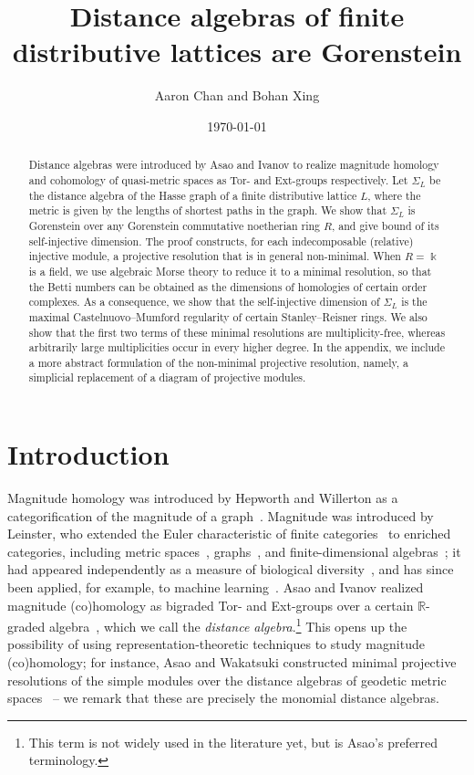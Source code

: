 \documentclass[a4paper,leqno]{amsart}
\title[Gorenstein distance algebras of lattices]{Distance algebras of finite distributive lattices are Gorenstein}
\author{Aaron Chan and Bohan Xing}
\date{\today}
\begin{document}
\begin{abstract}
Distance algebras were introduced by Asao and Ivanov to realize magnitude homology and cohomology of quasi-metric spaces as Tor- and Ext-groups respectively. 
Let $\Sigma_L$ be the distance algebra of the Hasse graph of a finite distributive lattice $L$, where the metric is given by the lengths of shortest paths in the graph.  
We show that $\Sigma_L$ is Gorenstein over any Gorenstein commutative noetherian ring $R$, and give bound of its self-injective dimension. 
The proof constructs, for each indecomposable (relative) injective module, a projective resolution that is in general non-minimal.  When $R=\Bbbk$ is a field, we use algebraic Morse theory to reduce it to a minimal resolution, so that the Betti numbers can be obtained as the dimensions of homologies of certain order complexes.
As a consequence, we show that the self-injective dimension of $\Sigma_L$ is the maximal Castelnuovo--Mumford regularity of certain Stanley--Reisner rings.  We also show that the first two terms of these minimal resolutions are multiplicity-free, whereas arbitrarily large multiplicities occur in every higher degree.  In the appendix, we include a more abstract formulation of the non-minimal projective resolution, namely, a simplicial replacement of a diagram of projective modules.
\end{abstract}
\maketitle
\tableofcontents

\section{Introduction}
\label{sec:introduction}


Magnitude homology was introduced by Hepworth and Willerton as a categorification of the magnitude of a graph~\cite{HW17}. Magnitude was introduced by Leinster, who extended the Euler characteristic of finite categories~\cite{Lei08} to enriched categories, including metric spaces~\cite{LW13,LM17}, graphs~\cite{Lei19}, and finite-dimensional algebras~\cite{CKL16}; it had appeared independently as a measure of biological diversity~\cite{SP94}, and has since been applied, for example, to machine learning~\cite{LASR24}. 
Asao and Ivanov realized magnitude (co)homology as bigraded Tor- and Ext-groups over a certain $\mathbb{R}$-graded algebra~\cite{AI24}, which we call the \emph{distance algebra}.\footnote{This term is not widely used in the literature yet, but is Asao's preferred terminology.} 
This opens up the possibility of using representation-theoretic techniques to study magnitude (co)homology; for instance, Asao and Wakatsuki constructed minimal projective resolutions of the simple modules over the distance algebras of geodetic metric spaces~\cite{AW24} -- we remark that these are precisely the monomial distance algebras.
\end{document}
